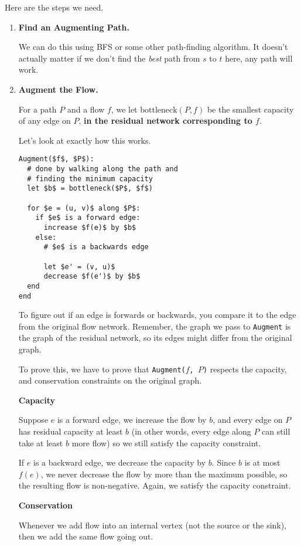 \documentclass[12pt]{article}
\begin{document}
  Here are the steps we need.

  \begin{enumerate}
    \item {\bf Find an Augmenting Path.}

      We can do this using BFS or some other path-finding algorithm. It doesn't
      actually matter if we don't find the {\it best} path from $s$ to $t$
      here, any path will work.

    \item {\bf Augment the Flow.}

      For a path $P$ and a flow $f$, we let $\text{bottleneck}(P, f)$ be the
      smallest capacity of any edge on $P$, {\bf in the residual network
      corresponding to $f$}.

      Let's look at exactly how this works.

      \begin{lstlisting}
Augment($f$, $P$):
  # done by walking along the path and
  # finding the minimum capacity
  let $b$ = bottleneck($P$, $f$)

  for $e = (u, v)$ along $P$:
    if $e$ is a forward edge:
      increase $f(e)$ by $b$
    else:
      # $e$ is a backwards edge

      let $e' = (v, u)$
      decrease $f(e')$ by $b$
  end
end
      \end{lstlisting}

      To figure out if an edge is forwards or backwards, you compare it to the
      edge from the original flow network. Remember, the graph we pass to
      \texttt{Augment} is the graph of the residual network, so its edges might
      differ from the original graph.

      {
        To prove this, we have to prove that \texttt{Augment($f$, $P$)} respects
        the capacity, and conservation constraints on the original graph.

        {\bf Capacity}

        Suppose $e$ is a forward edge, we increase the flow by $b$, and every edge
        on $P$ has residual capacity at least $b$ (in other words, every edge along
        $P$ can still take at least $b$ more flow) so we still satisfy the capacity
        constraint.

        If $e$ is a backward edge, we decrease the capacity by $b$. Since $b$ is at
        most $f(e)$, we never decrease the flow by more than the maximum possible,
        so the resulting flow is non-negative. Again, we satisfy the capacity
        constraint.

        {\bf Conservation}

        Whenever we add flow into an internal vertex (not the source or the
        sink), then we add the same flow going out.
      }

  \end{enumerate}
\end{document}
